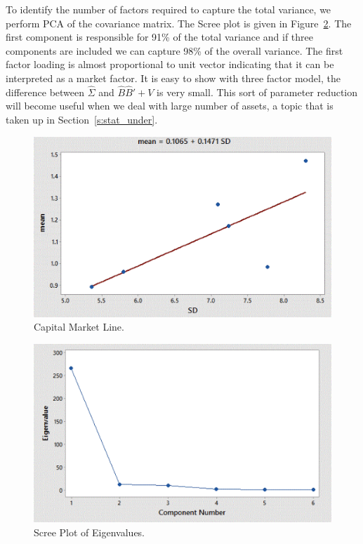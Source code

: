 To identify the number of factors required to capture the total variance, we perform PCA of the covariance matrix. The Scree plot is given in Figure~\ref{fig:screeplot}. The first component is responsible for 91\% of the total variance and if three components are included we can capture 98\% of the overall variance. The first factor loading is almost proportional to unit vector indicating that it can be interpreted as a market factor. It is easy to show with three factor model, the difference between $\hat{\Sigma}$ and $\hat{B}\hat{B}'+V$ is very small. This sort of parameter reduction will become useful when we deal with large number of assets, a topic that is taken up in Section~\ref{s:stat_under}.


\begin{figure}[!ht]
   \centering
   \includegraphics[width=\textwidth]{chapters/chapter_apm/figures/capmarket.png} 
   \caption{Capital Market Line.\label{fig:capmarket}}
\end{figure}


\begin{figure}[!ht]
   \centering
   \includegraphics[width=\textwidth]{chapters/chapter_apm/figures/scree.png} 
   \caption{Scree Plot of Eigenvalues.\label{fig:screeplot}}
\end{figure}
	

